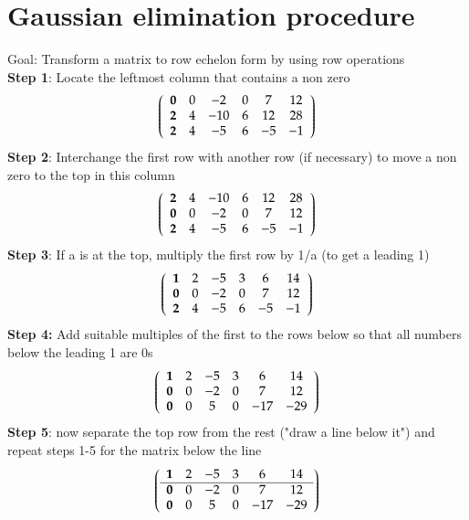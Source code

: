 \documentclass{article}[18pt]
\begin{document}
\section{Gaussian elimination procedure}
Goal: Transform a matrix to row echelon form by using row operations\\
\textbf{Step 1}: Locate the leftmost column that contains a non zero\\
$$\left( \begin{array} { c c c c c c } { \mathbf{0} } & { 0 } & { - 2 } & { 0 } & { 7 } & { 12 } \\ { \mathbf{2} } & { 4 } & { - 10 } & { 6 } & { 12 } & { 28 } \\ { \mathbf{2} } & { 4 } & { - 5 } & { 6 } & { - 5 } & { - 1 } \end{array} \right)$$
\textbf{Step 2}: Interchange the first row with another row (if necessary) to move a non zero to the top in this column
$$\left( \begin{array} { c c c c c c } { \textbf{2} } & { 4 } & { - 10 } & { 6 } & { 12 } & { 28 } \\ { \textbf{0} } & { 0 } & { - 2 } & { 0 } & { 7 } & { 12 } \\ { \textbf{2} } & { 4 } & { - 5 } & { 6 } & { - 5 } & { - 1 } \end{array} \right)$$
\textbf{Step 3}: If a is at the top, multiply the first row by 1/a (to get a leading 1)
$$\left( \begin{array} { c c c c c c } { \textbf{1} } & { 2 } & { - 5 } & { 3 } & { 6 } & { 14 } \\ { \textbf{0} } & { 0 } & { - 2 } & { 0 } & { 7 } & { 12 } \\ { \textbf{2} } & { 4 } & { - 5 } & { 6 } & { - 5 } & { - 1 } \end{array} \right)$$
\textbf{Step 4:} Add suitable multiples of the first to the rows below so that all numbers below the leading 1 are 0s
$$\left( \begin{array} { c c c c c c } { \textbf{1} } & { 2 } & { - 5 } & { 3 } & { 6 } & { 14 } \\ { \textbf{0} } & { 0 } & { - 2 } & { 0 } & { 7 } & { 12 } \\ { \textbf{0} } & { 0 } & { 5 } & { 0 } & { - 17 } & { - 29 } \end{array} \right)$$
\textbf{Step 5}: now separate the top row from the rest ("draw a line below it") and repeat steps 1-5 for the matrix below the line
$$\left( \begin{array} { c c c c c c } { \textbf{1} } & { 2 } & { - 5 } & { 3 } & { 6 } & { 14 } \\ \hline \textbf{0} & { 0 } & { - 2 } & { 0 } & { 7 } & { 12 } \\ { \textbf{0} } & { 0 } & { 5 } & { 0 } & { - 17 } & { - 29 } \end{array} \right)$$
\end{document}
